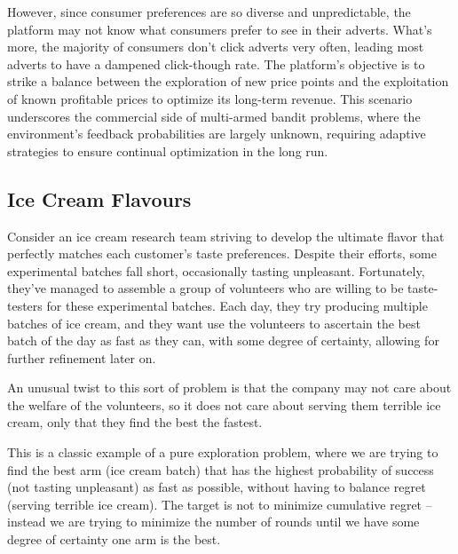 However, since consumer preferences are so diverse and unpredictable, the platform may not know what consumers prefer to see in their adverts. What's more, the majority of consumers don't click adverts very often, leading most adverts to have a dampened click-though rate. The platform's objective is to strike a balance between the exploration of new price points and the exploitation of known profitable prices to optimize its long-term revenue. This scenario underscores the commercial side of multi-armed bandit problems, where the environment's feedback probabilities are largely unknown, requiring adaptive strategies to ensure continual optimization in the long run.


\subsection{Ice Cream Flavours}
\label{ex:ice-cream}
Consider an ice cream research team striving to develop the ultimate flavor that perfectly matches each customer's taste preferences. Despite their efforts, some experimental batches fall short, occasionally tasting unpleasant. Fortunately, they've managed to assemble a group of volunteers who are willing to be taste-testers for these experimental batches. Each day, they try producing multiple batches of ice cream, and they want use the volunteers to ascertain the best batch of the day as fast as they can, with some degree of certainty, allowing for further refinement later on.

An unusual twist to this sort of problem is that the company may not care about the welfare of the volunteers, so it does not care about serving them terrible ice cream, only that they find the best the fastest.

This is a classic example of a pure exploration problem, where we are trying to find the best arm (ice cream batch) that has the highest probability of success (not tasting unpleasant) as fast as possible, without having to balance regret (serving terrible ice cream). The target is not to minimize cumulative regret – instead we are trying to minimize the number of rounds until we have some degree of certainty one arm is the best.
